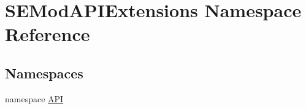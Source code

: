 \hypertarget{namespace_s_e_mod_a_p_i_extensions}{}\section{S\+E\+Mod\+A\+P\+I\+Extensions Namespace Reference}
\label{namespace_s_e_mod_a_p_i_extensions}
\subsection*{Namespaces}
\begin{DoxyCompactItemize}
\item 
namespace \hyperlink{namespace_s_e_mod_a_p_i_extensions_1_1_a_p_i}{A\+P\+I}
\end{DoxyCompactItemize}
